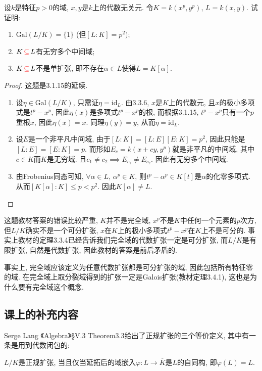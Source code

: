 \documentclass{../solutions-cn}
\begin{document}
\begin{exercise}[习题3.3.14*]
    设$k$是特征$p > 0$的域, $x, y$是$k$上的代数无关元. 令$K = k(x^p, y^p)$, $L = k(x, y)$. 试证明: 
    \begin{enumerate}[(1)]
        \item $\mathrm{Gal}(L/K) = \{1\}$ (但$[L:K] = p^2)$;
        \item $K \,\textcolor{red}{\subseteq}\, L$有无穷多个中间域;
        \item $K \,\textcolor{red}{\subseteq}\, L$不是单扩张, 即不存在$\alpha \in L$使得$L = K[\alpha]$.
    \end{enumerate}
\end{exercise}

\begin{proof}
    这题是3.1.15的延续.
    \begin{enumerate}[(1)]
        \item 设$\eta \in \mathrm{Gal}(L/K)$, 只需证$\eta = \mathrm{id}_L$. 由3.3.6, $x$是$K$上的代数元, 且$x$的极小多项式是$t^p - x^p$, 因此$\eta(x)$是多项式$t^p - x^p$的根, 而根据3.1.15, $t^p - x^p$只有一个$p$重根$x$, 因此$\eta(x) = x$. 同理$\eta(y) = y$, 从而$\eta = \mathrm{id}_L$.
        \item 设$E$是一个非平凡中间域, 由于$[L:K] = [L:E][E:K] = p^2$, 因此只能是$[L:E] = [E:K] = p$. 而形如$E_c = k(x + cy, y^p)$就是非平凡的中间域, 其中$c \in K$而$K$是无穷域. 且$c_1 \neq c_2 \implies E_{c_1} \neq E_{c_2}$. 因此有无穷多个中间域.
        \item 由Frobenius同态可知, $\forall \alpha \in L$, $\alpha^p \in K$, 则$t^p - \alpha^p \in K[t]$是$\alpha$的化零多项式. 从而$[K[\alpha]:K] \leqslant p < p^2$. 因此$K[\alpha] \neq L$.
    \end{enumerate}
\end{proof}

\begin{remark}
    这题教材答案的错误比较严重, $K$并不是完全域, $x^p$不是$K$中任何一个元素的$p$次方, 但$L/K$确实不是一个可分扩张, $x$在$K$上的极小多项式$t^p - x^p$在$K$上不是可分的. 事实上教材的定理3.3.4已经告诉我们完全域的代数扩张一定是可分扩张, 而$L/K$是有限扩张, 自然是代数扩张, 因此教材的答案是前后矛盾的.

    事实上, 完全域应该定义为任意代数扩张都是可分扩张的域, 因此包括所有特征零的域. 在完全域上取分裂域得到的扩张一定是Galois扩张(教材定理3.4.1), 这也是为什么要有完全域这个概念.
\end{remark}

\subsection*{课上的补充内容}
    Serge Lang 《Algebra》\S V.3 Theorem3.3给出了正规扩张的三个等价定义, 其中有一条是用到代数闭包的:

    $L/K$是正规扩张, 当且仅当延拓后的域嵌入$\varphi:L \to \overline{K}$是$L$的自同构, 即$\varphi(L) = L$.
\end{document}

